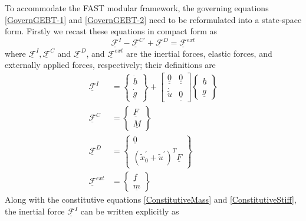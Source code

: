 \documentclass{aiaa-tc}
\renewcommand{\vec}[1]{\underline{#1}}
\begin{document}
To accommodate the FAST modular framework, the governing equations 
\eqref{GovernGEBT-1} and \eqref{GovernGEBT-2} need to be reformulated
into a state-space form. Firstly we recast these equations in compact form
as
\begin{equation}
    \label{CompactGovernGEBT}
    \underline{\mathcal{F}}^I - \underline{\mathcal{F}}^{C\prime} + \underline{\mathcal{F}}^D = \underline{\mathcal{F}}^{ext}
\end{equation}
where $\underline{\mathcal{F}}^I, \underline{\mathcal{F}}^C$ and $\underline{\mathcal{F}}^D$, and $\underline{\mathcal{F}}^{ext}$ are the inertial forces, elastic forces, and externally applied forces, respectively; their definitions are
\begin{align}
    \label{InertialForce}
    \underline{\mathcal{F}}^I &= \begin{Bmatrix}
    \dot{\underline{h}} \\
    \dot{\underline{g}}
    \end{Bmatrix}
    + \begin{bmatrix}
    \underline{\underline{0}} & \underline{\underline{0}} \\
    \dot{\tilde{u}}  &  \underline{\underline{0}}
    \end{bmatrix}
    \begin{Bmatrix}
    \vec{h} \\
    \vec{g}
    \end{Bmatrix} \\
    \label{ElasticForceFc}
     \underline{\mathcal{F}}^C &= \begin{Bmatrix}
    \underline{F} \\
    \underline{M}
    \end{Bmatrix} \\
    \label{ElasticForceFd}
    \underline{\mathcal{F}}^D &= \begin{Bmatrix}
    \underline{0} \\
    (\tilde{x}^\prime_0 + \tilde{u}^\prime)^T \underline{F}
    \end{Bmatrix} \\
    \label{AppliedForce}
    \underline{\mathcal{F}}^{ext} &= \begin{Bmatrix}
    \underline{f} \\
    \underline{m}
    \end{Bmatrix}
\end{align}   
Along with the constitutive equations \eqref{ConstitutiveMass} and \eqref{ConstitutiveStiff}, the inertial force $\underline{\mathcal{F}}^I$ can be written explicitly as
\end{document}
